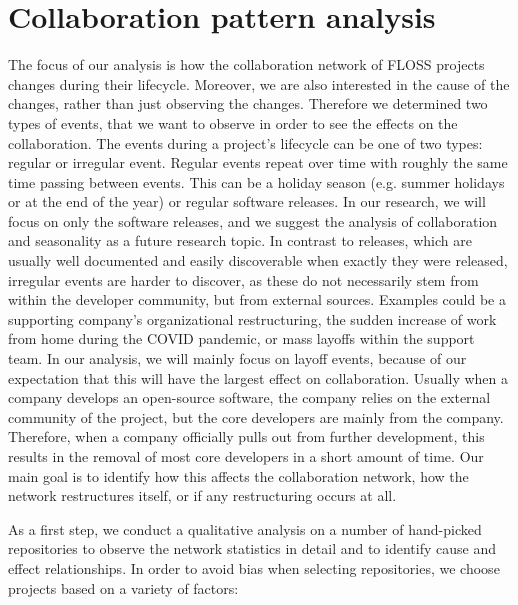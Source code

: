 \section{Collaboration pattern analysis}
\label{sec:patterns}
The focus of our analysis is how the collaboration network of FLOSS projects changes during their lifecycle. Moreover, we are also interested in the cause of the changes, rather than just observing the changes. Therefore we determined two types of events, that we want to observe in order to see the effects on the collaboration. The events during a project's lifecycle can be one of two types: regular or irregular event. Regular events repeat over time with roughly the same time passing between events. This can be a holiday season (e.g. summer holidays or at the end of the year) or regular software releases. In our research, we will focus on only the software releases, and we suggest the analysis of collaboration and seasonality as a future research topic. In contrast to releases, which are usually well documented and easily discoverable when exactly they were released, irregular events are harder to discover, as these do not necessarily stem from within the developer community, but from external sources. Examples could be a supporting company's organizational restructuring, the sudden increase of work from home during the COVID pandemic, or mass layoffs within the support team. In our analysis, we will mainly focus on layoff events, because of our expectation that this will have the largest effect on collaboration. Usually when a company develops an open-source software, the company relies on the external community of the project, but the core developers are mainly from the company. Therefore, when a company officially pulls out from further development, this results in the removal of most core developers in a short amount of time. Our main goal is to identify how this affects the collaboration network, how the network restructures itself, or if any restructuring occurs at all.

As a first step, we conduct a qualitative analysis on a number of hand-picked repositories to observe the network statistics in detail and to identify cause and effect relationships. In order to avoid bias when selecting repositories, we choose projects based on a variety of factors:


